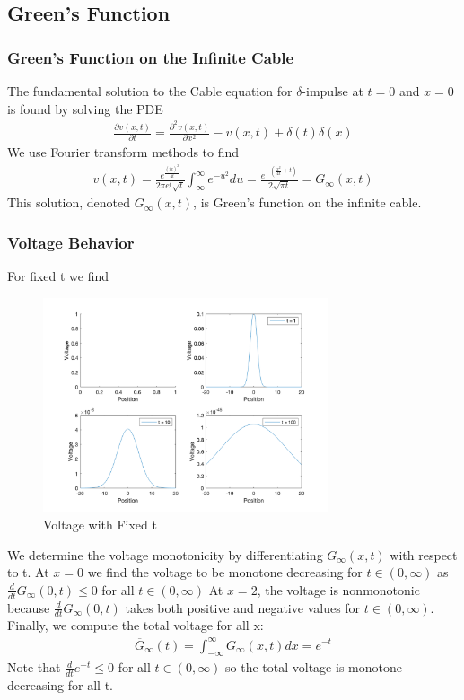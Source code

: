 \documentclass{article}
\begin{document}
\subsection{Green's Function}
\subsubsection{Green's Function on the Infinite Cable}
The fundamental solution to the Cable equation for $\delta$-impulse at $t=0$ and $x=0$ is found by solving the PDE 
\begin{gather*}
    \frac{\partial v(x,t)}{\partial t}=\frac{\partial^2v(x,t)}{\partial x^2}-v(x,t)+\delta(t)\delta(x)
\end{gather*}
We use Fourier transform methods to find
\begin{gather*}
    v(x,t)=\frac{e^{\frac{(ix)^2}{4t}}}{2\pi e^t\sqrt{t}}\int_\infty^\infty e^{-u^2}du=\frac{e^{-(\frac{x^2}{4t}+t)}}{2\sqrt{\pi t}}=G_\infty(x,t)
\end{gather*}
This solution, denoted $G_{\infty}(x,t)$, is Green's function on the infinite cable.
\subsubsection{Voltage Behavior}
For fixed t we find

\begin{figure}[H]
\centering
\includegraphics[width=0.75\textwidth]{fig1.png}
\caption{Voltage with Fixed t}
\label{fig:greens}
\end{figure}


We determine the voltage monotonicity by differentiating $G_{\infty}(x,t)$ with respect to t.  
At $x=0$ we find the voltage to be monotone decreasing for $t \in (0, \infty)$ as $\frac{d}{dt}G_{\infty}(0,t) \leq 0$ for all $t \in (0,\infty)$  
At $x=2$, the voltage is nonmonotonic because $\frac{d}{dt}G_{\infty}(0,t)$ takes both positive and negative values for $t \in (0, \infty)$.
Finally, we compute the total voltage for all x:
\begin{gather*} 
\overline{G}_\infty(t)=\int_{-\infty}^\infty G_\infty(x,t)dx=e^{-t}
\end{gather*}
Note that $\frac{d}{dt}e^{-t} \leq 0$ for all $t \in (0, \infty)$ so the total voltage is monotone decreasing for all t.
\end{document}
